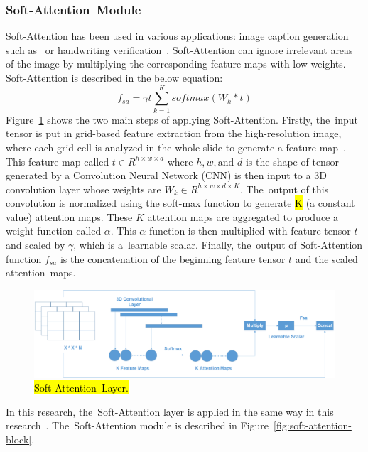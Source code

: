 \documentclass[sensors,article,accept,pdftex,moreauthors]{Definitions/mdpi}
\begin{document}
\subsubsection{Soft-Attention~Module}
Soft-Attention has been used in various applications: image caption generation such as~\cite{03044} or handwriting verification~\cite{202017}. Soft-Attention can ignore irrelevant areas of the image by multiplying the corresponding feature maps with low weights. Soft-Attention is described in the below equation:
\[
f_{sa} = \gamma t\sum_{k=1}^{K}softmax(W_k * t)
\]
Figure~\ref{fig:soft-attention} shows the two main steps of applying Soft-Attention. Firstly, the~input tensor is put in grid-based feature extraction from the high-resolution image, where each grid cell is analyzed in the whole slide to generate a feature map~\cite{08513}. This feature map called $t \in R^{h \times w \times d}$ where $h, w, \text{and } d$ is the shape of tensor generated by a Convolution Neural Network (CNN) is then input to a 3D convolution layer whose weights are $W_k \in R^{h \times w \times d \times K}$. The~output of this convolution is normalized using the soft-max function to generate \hl{K} %
 (a constant value) attention maps. These $K$ attention maps are aggregated to produce a weight function called $\alpha$. This $\alpha$ function is then multiplied with feature tensor $t$ and scaled by $\gamma$, which is a~learnable scalar. Finally, the~output of Soft-Attention function $f_{sa}$ is the concatenation of the beginning feature tensor $t$ and the scaled attention~maps. 

\begin{figure}[H]
	\includegraphics[width=1\linewidth]{Definitions/SoftAttention}
	\caption{\hl{Soft-Attention~Layer.} %
}
	\label{fig:soft-attention}
\end{figure}

In this research, the~Soft-Attention layer is applied in the same way in this research~\cite{03358}. The~Soft-Attention module is described in Figure~\ref{fig:soft-attention-block}.
\end{document}
